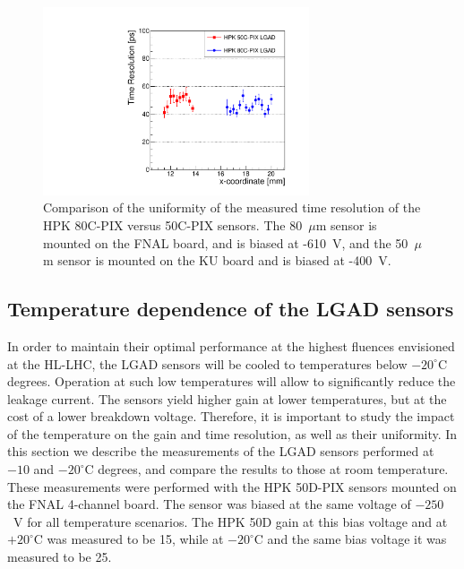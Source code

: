 \documentclass[preprint,1p]{elsarticle}
\begin{document}

\begin{figure}[htbp] 
\centering
\includegraphics[width=0.7\textwidth]{figs/FNAL_TimeResolution_vs_X_HPK50CVs80C.pdf} 
\caption{Comparison of the uniformity of the measured time resolution of the HPK 80C-PIX versus 50C-PIX sensors. The 80~$\mu$m sensor is mounted on the FNAL board, and is biased at -610~V, and the 50~$\mu$m sensor is mounted on the KU board and is biased at -400~V.} 
\label{fig:HPK50CVs80C} 
\end{figure} 

\subsection{Temperature dependence of the LGAD sensors}
\label{sec:temp_dependance}

In order to maintain their optimal performance at the highest fluences
envisioned at the HL-LHC, the LGAD sensors will be cooled to temperatures below
$-20^{\circ}$C degrees. Operation at such low temperatures will allow to
significantly reduce the leakage current. The sensors yield higher gain at lower 
temperatures, but at the cost of a lower breakdown voltage. Therefore, it is 
important to study the impact of the temperature on the gain and time 
resolution, as well as their uniformity. In this section we describe the measurements of
the LGAD sensors performed at $-10$ and $-20^{\circ}$C degrees, and compare the
results to those at room temperature. These measurements were performed with the
HPK 50D-PIX sensors mounted on the FNAL 4-channel board. The sensor was biased
at the same voltage of $-250$~V for all temperature scenarios. The HPK 50D gain
at this bias voltage and at $+20^{\circ}$C was measured to be 15, while at
$-20^{\circ}$C and the same bias voltage it was measured to be 25.
\end{document}

